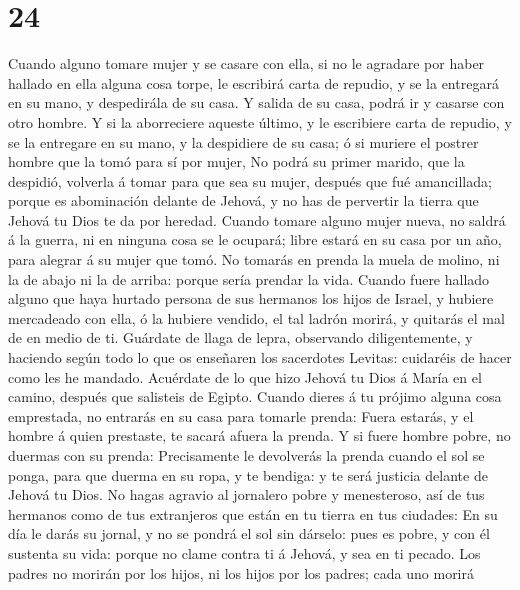 \hypertarget{section-23}{%
\section{24}\label{section-23}}

 Cuando alguno tomare mujer y se casare con ella, si no le
agradare por haber hallado en ella alguna cosa torpe, le escribirá carta
de repudio, y se la entregará en su mano, y despedirála de su casa.
 Y salida de su casa, podrá ir y casarse con otro hombre.
 Y si la aborreciere aqueste último, y le escribiere carta
de repudio, y se la entregare en su mano, y la despidiere de su casa; ó
si muriere el postrer hombre que la tomó para sí por mujer,
 No podrá su primer marido, que la despidió, volverla á
tomar para que sea su mujer, después que fué amancillada; porque es
abominación delante de Jehová, y no has de pervertir la tierra que
Jehová tu Dios te da por heredad.  Cuando tomare alguno
mujer nueva, no saldrá á la guerra, ni en ninguna cosa se le ocupará;
libre estará en su casa por un año, para alegrar á su mujer que tomó.
 No tomarás en prenda la muela de molino, ni la de abajo
ni la de arriba: porque sería prendar la vida.  Cuando
fuere hallado alguno que haya hurtado persona de sus hermanos los hijos
de Israel, y hubiere mercadeado con ella, ó la hubiere vendido, el tal
ladrón morirá, y quitarás el mal de en medio de ti. 
Guárdate de llaga de lepra, observando diligentemente, y haciendo según
todo lo que os enseñaren los sacerdotes Levitas: cuidaréis de hacer como
les he mandado.  Acuérdate de lo que hizo Jehová tu Dios á
María en el camino, después que salisteis de Egipto. 
Cuando dieres á tu prójimo alguna cosa emprestada, no entrarás en su
casa para tomarle prenda:  Fuera estarás, y el hombre á
quien prestaste, te sacará afuera la prenda.  Y si fuere
hombre pobre, no duermas con su prenda:  Precisamente le
devolverás la prenda cuando el sol se ponga, para que duerma en su ropa,
y te bendiga: y te será justicia delante de Jehová tu Dios.
 No hagas agravio al jornalero pobre y menesteroso, así
de tus hermanos como de tus extranjeros que están en tu tierra en tus
ciudades:  En su día le darás su jornal, y no se pondrá
el sol sin dárselo: pues es pobre, y con él sustenta su vida: porque no
clame contra ti á Jehová, y sea en ti pecado.  Los padres
no morirán por los hijos, ni los hijos por los padres; cada uno morirá
